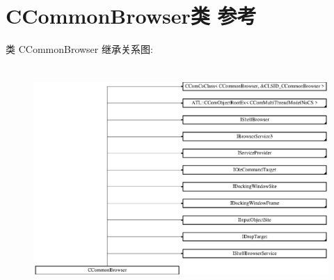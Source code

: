 \hypertarget{class_c_common_browser}{}\section{C\+Common\+Browser类 参考}
\label{class_c_common_browser}
类 C\+Common\+Browser 继承关系图\+:\begin{figure}[H]
\begin{center}
\leavevmode
\includegraphics[height=8.527918cm]{class_c_common_browser}
\end{center}
\end{figure}
